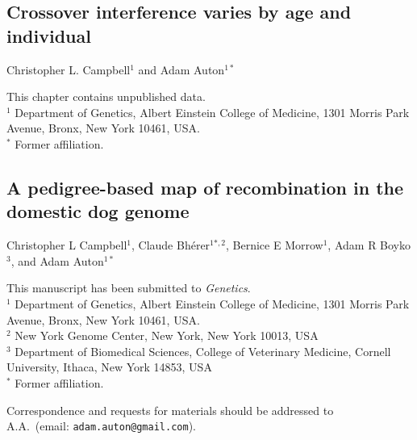 \documentclass[11pt,twoside,openright,letterpaper]{memoir}
\begin{document}



\begin{SingleSpace}
\chapter{Crossover interference varies by age and individual} \label{ch:cointExtras}

\noindent Christopher L. Campbell$^1$ and Adam Auton$^{1*}$

\vspace{0.5cm}
\noindent This chapter contains unpublished data.\\

\vspace{0.5cm}
\noindent $^1$ Department of Genetics, Albert Einstein College of Medicine, 1301 Morris Park Avenue, Bronx, New York 10461, USA. \\
\noindent $^*$ Former affiliation.
\end{SingleSpace}



\begin{SingleSpace}
\chapter[A pedigree-based map of recombination in the domestic dog genome][Recombination maps in the dog genome]{A pedigree-based map of recombination in the domestic dog genome} \label{ch:dogPed}

\noindent Christopher L Campbell$^1$, Claude Bh\'{e}rer$^{1*,2}$, Bernice E Morrow$^1$, Adam R Boyko$^3$, and Adam Auton$^{1*}$

\vspace{0.5cm}
\noindent This manuscript has been submitted to \textit{Genetics}. \\

\vspace{0.5cm}
\noindent $^1$ Department of Genetics, Albert Einstein College of Medicine, 1301 Morris Park Avenue, Bronx, New York 10461, USA. \\
\noindent $^2$ New York Genome Center, New York, New York 10013, USA \\
\noindent $^3$ Department of Biomedical Sciences, College of Veterinary Medicine, Cornell University, Ithaca, New York 14853, USA \\
\noindent $^*$ Former affiliation.

\vspace{0.5cm}
\begin{centering}
    Correspondence and requests for materials should be addressed to \\
    A.A.\ (email: \texttt{adam.auton@gmail.com}). \\
\end{centering}
\end{SingleSpace}
\end{document}
